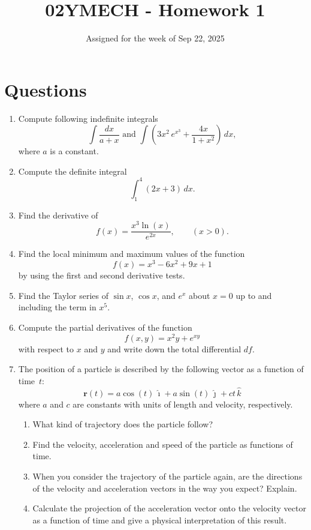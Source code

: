 \documentclass[12pt]{article}
\title{02YMECH - Homework 1}
\date{Assigned for the week of Sep 22, 2025}
\begin{document}
\maketitle

\section*{Questions}
\begin{enumerate}
    \item Compute following indefinite integrals
          \[
            \int \frac{dx}{a+x} \text{ and } \int \left(3x^2 \, e^{x^3} + \frac{4x}{1 + x^2}\right)\,dx,
          \]
          where \(a\) is a constant.

    \item Compute the definite integral
         \[
           \int_{1}^{4} (2x + 3)\,dx.
         \]
    
    \item Find the derivative of
          \[
            f(x) = \frac{x^3 \ln(x)}{e^{2x}}, \qquad (x>0).
          \]
    
    \item  Find the local minimum and maximum values of the function
           \[
             f(x) = x^3 - 6x^2 + 9x + 1
           \]
           by using the first and second derivative tests. 
    
    \item Find the Taylor series of $\sin x$, $\cos x$, and $e^x$ about $x=0$ up to and including the term in $x^5$.

    \item Compute the partial derivatives of the function
      \[
        f(x, y) = x^2 y + e^{xy}
      \]
      with respect to \(x\) and \(y\) and write down the total differential \(df\).
    
    \item The position of a particle is described by the following vector as a function of time~\(t\):
          \[
        \mathbf{r}(t) = a\cos(t)\,\hat{\imath} + a\sin(t)\,\hat{\jmath} + ct\,\hat{k} 
          \]
          where \(a\) and \(c\) are constants with units of length and velocity, respectively.
          \begin{enumerate}
            \item What kind of trajectory does the particle follow?
            \item Find the velocity, acceleration and speed of the particle as functions of time. 
            \item When you consider the trajectory of the particle again, are the directions of the velocity and acceleration vectors in the way you expect? Explain.
            \item Calculate the projection of the acceleration vector onto the velocity vector as a function of time and give a physical interpretation of this result.
          \end{enumerate}


\end{enumerate}
\end{document}
